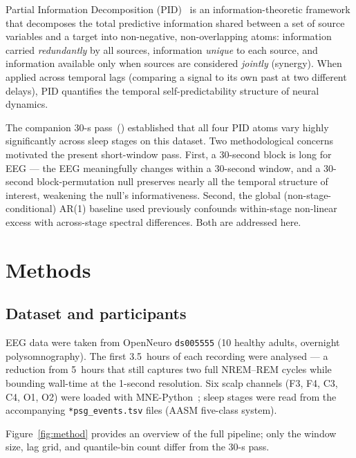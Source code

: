 \documentclass[11pt,a4paper]{article}
\begin{document}
Partial Information Decomposition (PID)~\citep{williams2010nonnegative} is an
information-theoretic framework that decomposes the total predictive
information shared between a set of source variables and a target into
non-negative, non-overlapping atoms: information carried \emph{redundantly} by
all sources, information \emph{unique} to each source, and information
available only when sources are considered \emph{jointly} (synergy).
When applied across temporal lags (comparing a signal to its own past at two
different delays), PID quantifies the temporal self-predictability structure of
neural dynamics.

The companion 30-s pass~(\citet{pid_sleep_report_30s}) established that all four
PID atoms vary highly significantly across sleep stages on this dataset.  Two
methodological concerns motivated the present short-window pass.  First, a
30-second block is long for EEG --- the EEG meaningfully changes within a
30-second window, and a 30-second block-permutation null preserves nearly all
the temporal structure of interest, weakening the null's informativeness.
Second, the global (non-stage-conditional) AR(1) baseline used previously
confounds within-stage non-linear excess with across-stage spectral
differences.  Both are addressed here.

\section{Methods}

\subsection{Dataset and participants}

EEG data were taken from OpenNeuro \texttt{ds005555} (10 healthy adults,
overnight polysomnography).  The first 3.5~hours of each recording were
analysed --- a reduction from 5~hours that still captures two full NREM--REM
cycles while bounding wall-time at the 1-second resolution.  Six scalp channels
(F3, F4, C3, C4, O1, O2) were loaded with MNE-Python~\citep{gramfort2013meg};
sleep stages were read from the accompanying \texttt{*psg\_events.tsv} files
(AASM five-class system).

Figure~\ref{fig:method} provides an overview of the full pipeline; only the
window size, lag grid, and quantile-bin count differ from the 30-s pass.
\end{document}
